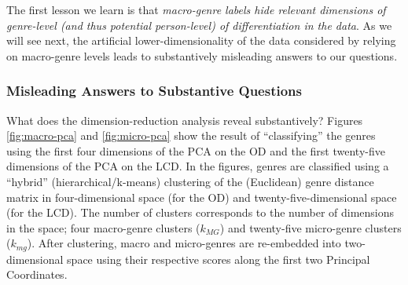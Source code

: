 \documentclass[a4paper,12pt]{extarticle}
\begin{document}
The first lesson we learn is that {\em macro-genre labels hide relevant dimensions of genre-level (and thus potential person-level) of differentiation in the data}. As we will see next, the artificial lower-dimensionality of the data considered by relying on macro-genre levels leads to substantively misleading answers to our questions.  

\subsubsection{Misleading Answers to Substantive Questions}
 What does the dimension-reduction analysis reveal substantively? Figures \ref{fig:macro-pca} and \ref{fig:micro-pca} show the result of ``classifying'' the genres using the first four dimensions of the PCA on the OD and the first twenty-five dimensions of the PCA on the LCD. In the figures, genres are classified using a ``hybrid'' (hierarchical/k-means) clustering of the (Euclidean) genre distance matrix in four-dimensional space (for the OD) and twenty-five-dimensional space (for the LCD). The number of clusters corresponds to the number of dimensions in the space; four macro-genre clusters ($k_{MG}$) and twenty-five micro-genre clusters ($k_{mg}$). After clustering, macro and micro-genres are re-embedded into two-dimensional space using their respective scores along the first two Principal Coordinates. 
 
\end{document}
